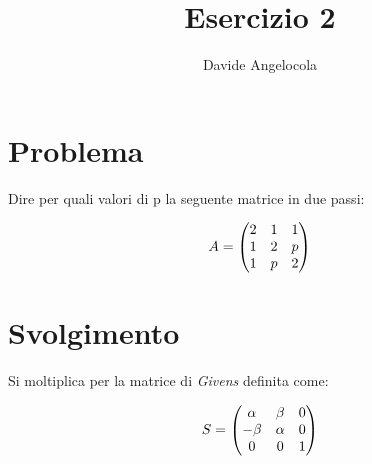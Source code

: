 \documentclass{article}
\title{Esercizio 2}
\author{Davide Angelocola}
\begin{document}
\maketitle

\section{Problema}
Dire per quali valori di p la seguente matrice in due passi:

$$A = \begin{pmatrix}2 & 1 & 1\cr 1 & 2 & p \cr 1 & p & 2  \end{pmatrix}$$

\section{Svolgimento}

Si moltiplica per la matrice di \textit{Givens} definita come:

$$S = \begin{pmatrix}\alpha & \beta & 0 \cr -\beta & \alpha & 0 \cr 0 & 0 & 1\end{pmatrix}$$
\end{document}
